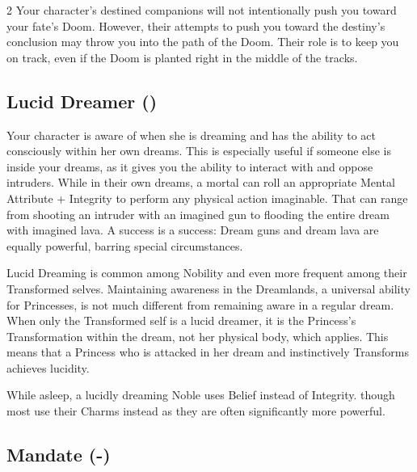 \begin{multicols}{2}
Your character's destined companions will not intentionally push you toward your fate's Doom. However, their attempts to push you toward the destiny's conclusion may throw you into the path of the Doom. Their role is to keep you on track, even if the Doom is planted right in the middle of the tracks.


\subsection*{Lucid Dreamer (\textbullet\textbullet)}

Your character is aware of when she is dreaming and has the ability to act consciously within her own dreams. This is especially useful if someone else is inside your dreams, as it gives you the ability to interact with and oppose intruders. While in their own dreams, a mortal can roll an appropriate Mental Attribute + Integrity to perform any physical action imaginable. That can range from shooting an intruder with an imagined gun to flooding the entire dream with imagined lava. A success is a success: Dream guns and dream lava are equally powerful, barring special circumstances. 

Lucid Dreaming is common among Nobility and even more frequent among their Transformed selves. Maintaining awareness in the Dreamlands, a universal ability for Princesses, is not much different from remaining aware in a regular dream. When only the Transformed self is a lucid dreamer, it is the Princess's Transformation within the dream, not her physical body, which applies. This means that a Princess who is attacked in her dream and instinctively Transforms achieves lucidity. 

While asleep, a lucidly dreaming Noble uses Belief instead of Integrity. though most use their Charms instead as they are often significantly more powerful.

\subsection*{Mandate (\textbullet\nobreak\hspace{.16667em}-\nobreak\hspace{.16667em}\textbullet\textbullet\textbullet)}


\end{multicols}
